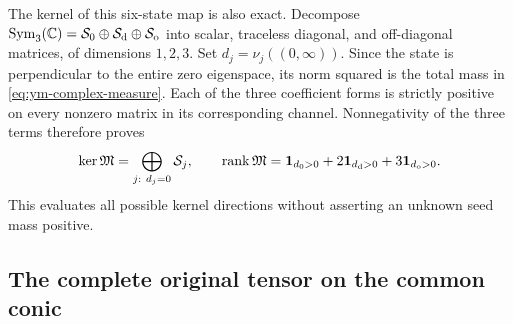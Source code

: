 The kernel of this six-state map is also exact. Decompose
$\operatorname{Sym}_3(\mathbb C)=\mathcal S_0\oplus
\mathcal S_{\rm d}\oplus\mathcal S_{\rm o}$ into scalar,
traceless diagonal, and off-diagonal matrices, of dimensions
$1,2,3$. Set $d_j=\nu_j((0,\infty))$. Since the state is
perpendicular to the entire zero eigenspace, its norm squared
is the total mass in \eqref{eq:ym-complex-measure}. Each of the
three coefficient forms is strictly positive on every nonzero
matrix in its corresponding channel. Nonnegativity of the
three terms therefore proves
\[
 \ker\mathfrak M=\bigoplus_{j:\ d_j=0}\mathcal S_j,\qquad
 \operatorname{rank}\mathfrak M
 =\mathbf1_{d_0>0}+2\mathbf1_{d_{\rm d}>0}
                         +3\mathbf1_{d_{\rm o}>0}.
\]
This evaluates all possible kernel directions without asserting
an unknown seed mass positive.

\subsection{The complete original tensor on the common conic}

